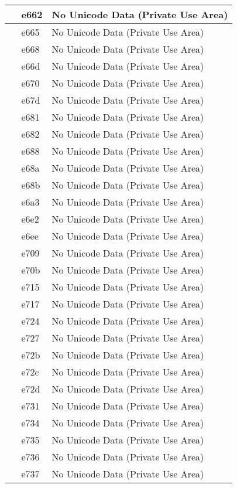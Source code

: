 \documentclass[12pt,letterpaper,openany]{book}
\begin{document}
\begin{center}
\begin{supertabular}{|m{0.25in}|m{0.5in}|m{4in}|}
 & e662 & No Unicode Data (Private Use Area)\\\hline
 & e665 & No Unicode Data (Private Use Area)\\\hline
 & e668 & No Unicode Data (Private Use Area)\\\hline
 & e66d & No Unicode Data (Private Use Area)\\\hline
 & e670 & No Unicode Data (Private Use Area)\\\hline
 & e67d & No Unicode Data (Private Use Area)\\\hline
 & e681 & No Unicode Data (Private Use Area)\\\hline
 & e682 & No Unicode Data (Private Use Area)\\\hline
 & e688 & No Unicode Data (Private Use Area)\\\hline
 & e68a & No Unicode Data (Private Use Area)\\\hline
 & e68b & No Unicode Data (Private Use Area)\\\hline
 & e6a3 & No Unicode Data (Private Use Area)\\\hline
 & e6e2 & No Unicode Data (Private Use Area)\\\hline
 & e6ee & No Unicode Data (Private Use Area)\\\hline
 & e709 & No Unicode Data (Private Use Area)\\\hline
 & e70b & No Unicode Data (Private Use Area)\\\hline
 & e715 & No Unicode Data (Private Use Area)\\\hline
 & e717 & No Unicode Data (Private Use Area)\\\hline
 & e724 & No Unicode Data (Private Use Area)\\\hline
 & e727 & No Unicode Data (Private Use Area)\\\hline
 & e72b & No Unicode Data (Private Use Area)\\\hline
 & e72c & No Unicode Data (Private Use Area)\\\hline
 & e72d & No Unicode Data (Private Use Area)\\\hline
 & e731 & No Unicode Data (Private Use Area)\\\hline
 & e734 & No Unicode Data (Private Use Area)\\\hline
 & e735 & No Unicode Data (Private Use Area)\\\hline
 & e736 & No Unicode Data (Private Use Area)\\\hline
 & e737 & No Unicode Data (Private Use Area)\\\hline

\end{supertabular}
\end{center}
\end{document}
